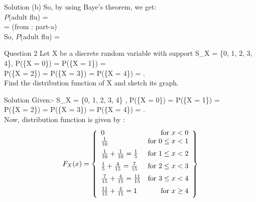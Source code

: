 \documentclass{beamer}
\begin{document}
\begin{frame}{Solution}
\large{
(b) So, by using Baye's theorem, we get:
\vspace{2mm}\hspace{10mm}\\
$P$(adult \mid flu) = \\
\vspace{2mm}\hspace{10mm}
 =              \hspace{50mm}(from : part-a)\\
\vspace{2mm}\hspace{10mm}
So, $P$(adult \mid flu) = \\}
\end{frame}

\begin{frame}{Question 2}
\large {
Let X be a discrete random variable with support S_X = \{0, 1, 2, 3, 4\}, P(\{X = 0\}) =
P(\{X = 1\}) =  \\
P(\{X = 2\}) = P(\{X = 3\}) = P(\{X = 4\}) = .\\
Find the distribution
function of X and sketch its graph.}
\end{frame}

\begin{frame}{Solution}
Given:- S_X = \{0, 1, 2, 3, 4\} , P(\{X = 0\}) =
P(\{X = 1\}) =  \\
P(\{X = 2\}) = P(\{X = 3\}) = P(\{X = 4\}) = .\\
\vspace{2mm}
Now, distribution function is given by :\\
\begin{equation*}
    F_X(x) = \left\{\begin{array}{lr}
        0 & \text{for } x < 0\\
        \vspace{2mm}
        \frac{1}{10} & \text{for } 0\leq x<1\\
        \vspace{2mm}
        \frac{1}{10} + \frac{1}{10} = \frac{1}{5} & \text{for } 1\leq x<2\\
        \vspace{2mm}
        \frac{1}{5} + \frac{4}{15} = \frac{7}{15}  & \text{for } 2\leq x<3\\
        \vspace{2mm}
        \frac{7}{15} + \frac{4}{15} = \frac{11}{15}  & \text{for } 3\leq x<4\\
        \vspace{2mm}
        \frac{11}{15} + \frac{4}{15} = 1  & \text{for } x \geq 4
        \end{array}\right\}
\end{equation*}
\end{frame}
\end{document}
